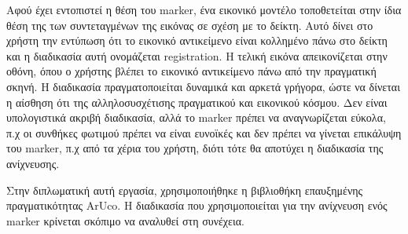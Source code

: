 Αφού έχει εντοπιστεί η θέση του marker, ένα εικονικό μοντέλο τοποθετείται στην ίδια θέση της των συντεταγμένων της εικόνας σε σχέση με το δείκτη. Αυτό δίνει στο χρήστη την εντύπωση ότι το εικονικό αντικείμενο είναι κολλημένο πάνω στο δείκτη και η διαδικασία αυτή ονομάζεται registration. Η τελική εικόνα απεικονίζεται στην οθόνη, όπου ο χρήστης βλέπει το εικονικό αντικείμενο πάνω από την πραγματική σκηνή. Η διαδικασία πραγματοποιείται δυναμικά και αρκετά γρήγορα, ώστε να δίνεται η αίσθηση ότι της αλληλοσυσχέτισης πραγματικού και εικονικού κόσμου. Δεν είναι υπολογιστικά ακριβή διαδικασία, αλλά το marker πρέπει να αναγνωρίζεται εύκολα, π.χ οι συνθήκες φωτιμού πρέπει να είναι ευνοϊκές και δεν πρέπει να γίνεται επικάλυψη του marker, π.χ από τα χέρια του χρήστη, διότι τότε θα αποτύχει η διαδικασία της ανίχνευσης. 


Στην διπλωματική αυτή εργασία, χρησιμοποιήθηκε η βιβλιοθήκη επαυξημένης πραγματικότητας ArUco. Η διαδικασία που χρησιμοποιείται για την ανίχνευση ενός marker κρίνεται σκόπιμο να αναλυθεί στη συνέχεια.



